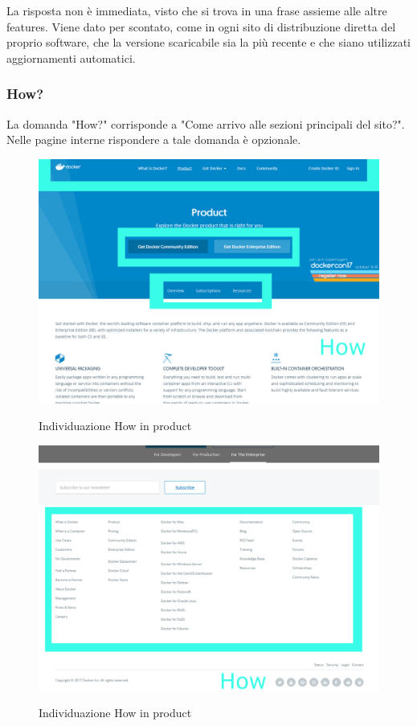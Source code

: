 \documentclass[a4paper]{article}
\begin{document}
\noindent La risposta non è immediata, visto che si trova in una frase assieme alle altre features. Viene dato per scontato, come in ogni sito di distribuzione diretta del proprio software, che la versione scaricabile sia la più recente e che siano utilizzati aggiornamenti automatici.

\subsubsection{How?}
La domanda "How?" corrisponde a "Come arrivo alle sezioni principali del sito?".
\\
Nelle pagine interne rispondere a tale domanda è opzionale.

\begin{figure}[H]
	\centering
	\includegraphics[width=\linewidth]{images/producthow1.png}
    \label{fig:producthow1}
    \caption{Individuazione How in product}
\end{figure}

\begin{figure}[H]
	\centering
	\includegraphics[width=\linewidth]{images/producthow2.png}
    \label{fig:producthow2}
    \caption{Individuazione How in product}
\end{figure}
\end{document}

